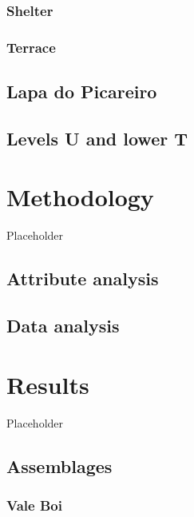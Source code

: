 \documentclass[12pt,twoside]{reedthesis}
\begin{document}
\hypertarget{shelter}{%
\subsection{Shelter}\label{shelter}}

\hypertarget{terrace}{%
\subsection{Terrace}\label{terrace}}

\hypertarget{lapa-do-picareiro-1}{%
\section{Lapa do Picareiro}\label{lapa-do-picareiro-1}}

\hypertarget{levels-u-and-lower-t}{%
\section{Levels U and lower T}\label{levels-u-and-lower-t}}

\hypertarget{methodology}{%
\chapter{Methodology}\label{methodology}}

Placeholder

\hypertarget{attribute-analysis}{%
\section{Attribute analysis}\label{attribute-analysis}}

\hypertarget{data-analysis}{%
\section{Data analysis}\label{data-analysis}}

\hypertarget{results}{%
\chapter{Results}\label{results}}

Placeholder

\hypertarget{assemblages}{%
\section{Assemblages}\label{assemblages}}

\hypertarget{vale-boi-2}{%
\subsection{Vale Boi}\label{vale-boi-2}}
\end{document}
